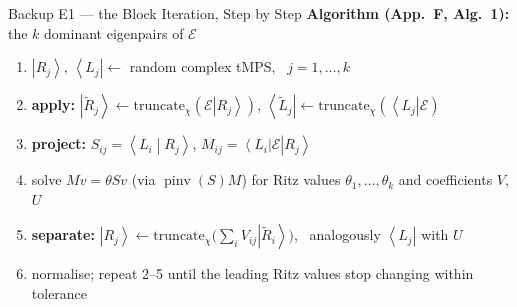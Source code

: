 \documentclass[aspectratio=169,11pt]{beamer}
\newcommand{\thesectiontag}{}
\newcommand{\slidesection}[1]{\renewcommand{\thesectiontag}{#1}}
\newcommand{\E}{\mathcal{E}}
\newcommand{\ket}[1]{\left|#1\right\rangle}
\newcommand{\bra}[1]{\left\langle#1\right|}
\newcommand{\braket}[2]{\left\langle#1\middle|#2\right\rangle}
\begin{document}
\slidesection{backup $\cdot$ the block method}
\begin{frame}{Backup E1 --- the Block Iteration, Step by Step}
  \small
  \textbf{Algorithm (App.~F, Alg.~1):} the $k$ dominant eigenpairs of $\E$
  \begin{enumerate}\setlength{\itemsep}{0.35em}
    \item $\ket{R_j},\,\bra{L_j} \gets$ random complex tMPS, \ $j=1,\dots,k$
    \item \textbf{apply:}\quad
          $\ket{\tilde R_j} \gets \mathrm{truncate}_\chi(\E\ket{R_j})$,\qquad
          $\bra{\tilde L_j} \gets \mathrm{truncate}_\chi(\bra{L_j}\E)$
    \item \textbf{project:}\quad
          $S_{ij}=\braket{L_i}{R_j}$,\qquad
          $M_{ij}=\bra{L_i}\E\ket{R_j}$
    \item solve $Mv=\theta Sv$ (via $\operatorname{pinv}(S)M$) for Ritz
          values $\theta_1,\dots,\theta_k$ and coefficients $V$, $U$
    \item \textbf{separate:}\quad
          $\ket{R_j} \gets \mathrm{truncate}_\chi\big(\textstyle\sum_i
            V_{ij}\ket{\tilde R_i}\big)$, \ analogously $\bra{L_j}$ with $U$
    \item normalise; repeat 2--5 until the leading Ritz values stop
          changing within tolerance
  \end{enumerate}
\end{frame}
\end{document}
